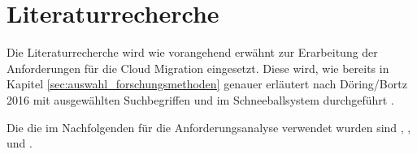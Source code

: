 \section{Literaturrecherche}
Die Literaturrecherche wird wie vorangehend erwähnt zur Erarbeitung der Anforderungen für die Cloud Migration eingesetzt. Diese wird, wie bereits in Kapitel \ref{sec:auswahl_forschungsmethoden} genauer erläutert nach Döring/Bortz 2016 mit ausgewählten Suchbegriffen und im Schneeballsystem durchgeführt \cite[S. 158ff]{Doering2016}.

Die \grqq{} \cite[S. 158]{Doering2016} die im Nachfolgenden für die Anforderungsanalyse verwendet wurden sind \grqq{}, \grqq{}, \grqq{} und \grqq{}.